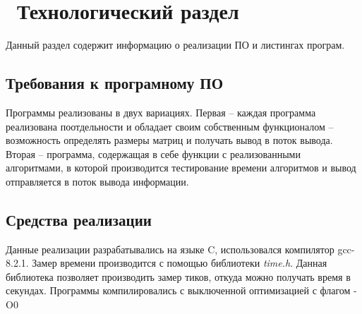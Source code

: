 \chapter{ Технологический раздел}
\label{cha:impl}

Данный раздел содержит информацию о реализации ПО и листингах програм.

\section{ Требования к програмному ПО}
Программы реализованы в двух вариациях. Первая -- каждая программа реализована поотдельности и обладает своим собственным функционалом -- возможность определять размеры матриц и получать вывод в поток вывода. Вторая -- программа, содержащая в себе функции с реализованными алгоритмами, в которой производится тестирование времени алгоритмов и вывод отправляется в поток вывода информации.

\section{ Средства реализации }
Данные реализации разрабатывались на языке C, использовался компилятор gcc-8.2.1.
Замер времени производится с помощью библиотеки \textit{time.h}. Данная библиотека позволяет производить замер тиков, откуда можно получать время в секундах. 
Программы компилировались с выключенной оптимизацией с флагом -O0

